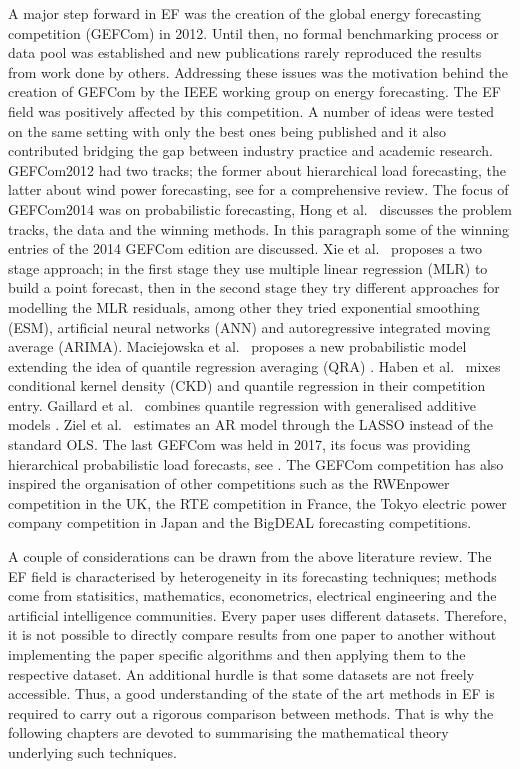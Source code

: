 A major step forward in EF was the creation of the global energy forecasting competition (GEFCom) in 2012. Until then, no formal benchmarking process or data pool was established and new publications rarely reproduced the results from work done by others. Addressing these issues was the motivation behind the creation of GEFCom by the IEEE working group on energy forecasting. The EF field was positively affected by this competition. A number of ideas were tested on the same setting with only the best ones being published and it also contributed bridging the gap between industry practice and academic research. GEFCom2012 had two tracks; the former about hierarchical load forecasting, the latter about wind power forecasting, see \cite{hong2014global} for a comprehensive review. 
The focus of GEFCom2014 was on probabilistic forecasting, Hong et al.\ \cite{hong2016probabilistic} discusses the problem tracks, the data and the winning methods.
In this paragraph some of the winning entries of the 2014 GEFCom edition are discussed.
Xie et al.\ \cite{xie2016gefcom2014} proposes a two stage approach; in the first stage they use multiple linear regression (MLR) to build a point forecast, then in the second stage they try different approaches for modelling the MLR residuals, among other they tried exponential smoothing (ESM), artificial neural networks (ANN) and autoregressive integrated moving average (ARIMA). 
Maciejowska et al.\ \cite{maciejowska2016hybrid} proposes a new probabilistic model extending the idea of quantile regression averaging (QRA) \cite{nowotarski2015computing}.
Haben et al.\ \cite{haben2016hybrid} mixes conditional kernel density (CKD) and quantile regression in their competition entry.
Gaillard et al.\ \cite{gaillard2016additive,gaillardasemi} combines quantile regression with generalised additive models \cite{hastie2017generalized}.
Ziel et al.\ \cite{ziel2016lasso} estimates an AR model through the LASSO \cite{tibshirani1996regression} instead of the standard OLS.
The last GEFCom was held in 2017, its focus was providing hierarchical probabilistic load forecasts, see \cite{hong2019global}. The GEFCom competition has also inspired the organisation of other competitions such as the RWEnpower competition in the UK, the RTE competition in France, the Tokyo electric power company competition in Japan and the BigDEAL forecasting competitions.

A couple of considerations can be drawn from the above literature review.
The EF field is characterised by heterogeneity in its forecasting techniques; methods come from statisitics, mathematics, econometrics, electrical engineering and the artificial intelligence communities.
Every paper uses different datasets.
Therefore, it is not possible to directly compare results from one paper to another without implementing the paper specific algorithms and then applying them to the respective dataset. An additional hurdle is that some datasets are not freely accessible.
Thus, a good understanding of the state of the art methods in EF is required to carry out a rigorous comparison between methods.
That is why the following chapters are devoted to summarising the mathematical theory underlying such techniques.


